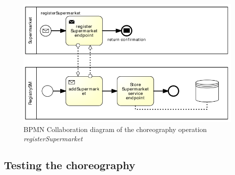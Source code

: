 \begin{figure}[htbp]
\begin{center}
	\includegraphics{images/registerSupermarketworkflow}
\caption{BPMN Collaboration diagram of the choreography operation \emph{registerSupermarket}}
\label{registerSupermarketworkflow}
\end{center}
\end{figure}

\subsection{Testing the choreography}

